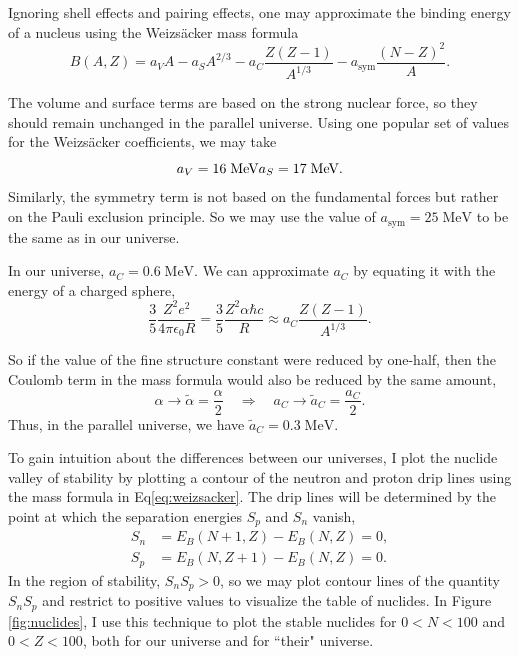 \documentclass[%
 reprint,
 amsmath,amssymb,
 aps,
]{revtex4-1}
\begin{document}
Ignoring shell effects and pairing effects, one may approximate the binding energy of a nucleus using the Weizs\"acker mass formula\cite{1935ZPhy...96..431W}
\begin{equation}
	B(A, Z) = a_V A - a_S A^{2/3} - a_C \frac{Z (Z-1)}{A^{1/3}}
	- a_{\text{sym}} \frac{(N-Z)^2}{A}.
	\label{eq:weizsacker}
\end{equation}

The volume and surface terms are based on the strong nuclear force, so they should remain unchanged in the parallel universe. Using one popular set of values for the Weizs\"acker coefficients\cite{wong1990introductory}, we may take
\begin{equation}
	a_V = 16 \; \text{MeV} \\
	a_S = 17 \; \text{MeV}.
\end{equation}
Similarly, the symmetry term is not based on the fundamental forces but rather on the Pauli exclusion principle. So we may use the value of $a_{\text{sym}} = 25 \; \text{MeV}$ to be the same as in our universe.\cite{wong1990introductory}

In our universe, $a_C = 0.6 \; \text{MeV}$. We can approximate $a_C$ by equating it with the energy of a charged sphere,
\begin{equation}
	\frac{3}{5} \frac{Z^2 e^2}{4 \pi \epsilon_0 R} = 
	\frac{3}{5} \frac{Z^2 \alpha \hbar c}{R}
	\approx a_C \frac{Z(Z-1)}{A^{1/3}}.
\end{equation}

So if the value of the fine structure constant were reduced by one-half, then the Coulomb term in the mass formula would also be reduced by the same amount,
\begin{equation}
	\alpha \rightarrow \widetilde{\alpha} = \frac{\alpha}{2}
	\quad \Longrightarrow \quad
	a_C \rightarrow \widetilde{a}_C = \frac{a_C}{2}.
\end{equation}
Thus, in the parallel universe, we have $\widetilde{a}_C = 0.3 \; \text{MeV}$.

To gain intuition about the differences between our universes, I plot the nuclide valley of stability by plotting a contour of the neutron and proton drip lines using the mass formula in Eq\eqref{eq:weizsacker}. The drip lines will be determined by the point at which the separation energies $S_p$ and $S_n$ vanish,
\begin{align}
	S_n &= E_B(N+1, Z) - E_B(N, Z) = 0, \\
	S_p &= E_B(N, Z+1) - E_B(N, Z) = 0.
\end{align}
In the region of stability, $S_n S_p > 0$, so we may plot contour lines of the quantity $S_n S_p$ and restrict to positive values to visualize the table of nuclides. In Figure \ref{fig:nuclides}, I use this technique to plot the stable nuclides for $0 < N < 100$ and $0 < Z < 100$, both for our universe and for ``their" universe.
\end{document}
